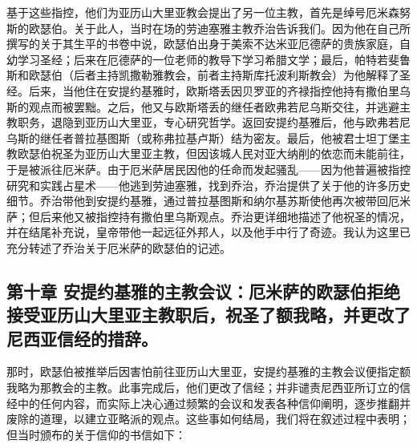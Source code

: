 基于这些指控，他们为亚历山大里亚教会提出了另一位主教，首先是绰号厄米森努斯的欧瑟伯。关于此人，当时在场的劳迪塞雅主教乔治告诉我们。因为他在自己所撰写的关于其生平的书卷中说，欧瑟伯出身于美索不达米亚厄德萨的贵族家庭，自幼学习圣经；后来在厄德萨的一位老师的教导下学习希腊文学；最后，帕特若斐鲁斯和欧瑟伯（后者主持凯撒勒雅教会，前者主持斯库托波利斯教会）为他解释了圣经。后来，当他住在安提约基雅时，欧斯塔丢因贝罗亚的齐禄指控他持有撒伯里乌斯的观点而被罢黜。之后，他又与欧斯塔丢的继任者欧弗若尼乌斯交往，并逃避主教职务，退隐到亚历山大里亚，专心研究哲学。返回安提约基雅后，他与欧弗若尼乌斯的继任者普拉基图斯（或称弗拉基卢斯）结为密友。最后，他被君士坦丁堡主教欧瑟伯祝圣为亚历山大里亚主教，但因该城人民对亚大纳削的依恋而未能前往，于是被派往厄米萨。由于厄米萨居民因他的任命而发起骚乱——因为他普遍被指控研究和实践占星术——他逃到劳迪塞雅，找到乔治，乔治提供了关于他的许多历史细节。乔治带他到安提约基雅，通过普拉基图斯和纳尔基苏斯使他再次被带回厄米萨；但后来他又被指控持有撒伯里乌斯观点。乔治更详细地描述了他祝圣的情况，并在结尾补充说，皇帝带他一起远征外邦人，以及他手中行了奇迹。我认为这里已充分转述了乔治关于厄米萨的欧瑟伯的记述。\par


\subsection{第十章 安提约基雅的主教会议：厄米萨的欧瑟伯拒绝接受亚历山大里亚主教职后，祝圣了额我略，并更改了尼西亚信经的措辞。}

那时，欧瑟伯被推举后因害怕前往亚历山大里亚，安提约基雅的主教会议便指定额我略为那教会的主教。此事完成后，他们更改了信经；并非谴责尼西亚所订立的信经中的任何内容，而实际上决心通过频繁的会议和发表各种信仰阐明，逐步推翻并废除的道理，以建立亚略派的观点。这些事如何结局，我们将在叙述过程中表明；但当时颁布的关于信仰的书信如下：\par

\par

